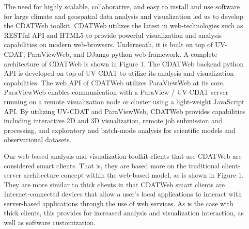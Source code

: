 \documentclass[a0,landscape]{a0poster}
\newenvironment{pcol}[1]{
  \begin{minipage}[t]{#1}
}{
  \end{minipage}
}
\begin{document}
\begin{textblock}{35}
\begin{pcol}{\threecolwidth}
\vspace{1cm}
\large
The need for highly scalable, collaborative, and easy to install and use software for large climate and geospatial data analysis and visualization led us to develop the CDATWeb toolkit. CDATWeb utilizes the latest in web-technologies such as RESTful API and HTML5 to provide powerful visualization and analysis capabilities on modern web-browsers. Underneath, it is built on top of UV-CDAT, ParaViewWeb, and DJango python web-framework. A complete architecture of CDATWeb is shown in Figure 1. The CDATWeb backend python API is developed on top of UV-CDAT to utilize its analysis and visualization capabilities. The web API of CDATWeb utilizes ParaViewWeb at its core. ParaViewWeb enables communication with a ParaView / UV-CDAT server running on a remote visualization node or cluster using a light-weight JavaScript API. By utilizing UV-CDAT and ParaViewWeb, CDATWeb provides capabilities including interactive 2D and 3D visualization, remote job submission and processing, and exploratory and batch-mode analysis for scientific models and observational datasets.

\vspace{1cm}
\large

Our web-based analysis and visualization toolkit clients that use CDATWeb are considered smart clients. That is, they are based more on the traditional client-server architecture concept within the web-based model, as is shown in Figure 1. They are more similar to thick clients in that CDATWeb smart clients are Internet-connected devices that allow a user’s local applications to interact with server-based applications through the use of web services. As is the case with thick clients, this provides for increased analysis and visualization interaction, as well as software customization.

\end{pcol}
\end{textblock}

\end{document}
